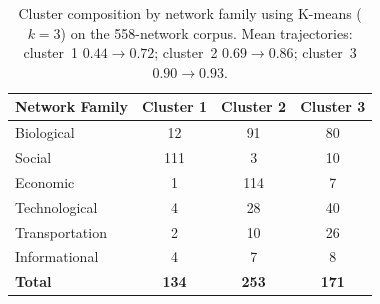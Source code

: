 \begin{table}[t]
    \centering
    \caption{Cluster composition by network family using K-means ($k=3$) on the 558-network corpus. Mean trajectories: cluster~1 $0.44 \to 0.72$; cluster~2 $0.69 \to 0.86$; cluster~3 $0.90 \to 0.93$.}
    \label{tab:kmeans3}
    \begin{tabular}{lccc}
        \toprule
        \textbf{Network Family} & \textbf{Cluster 1} & \textbf{Cluster 2} & \textbf{Cluster 3} \\
        \midrule
        Biological     &  12 &  91 &  80 \\
        Social         & 111 &   3 &  10 \\
        Economic       &   1 & 114 &   7 \\
        Technological  &   4 &  28 &  40 \\
        Transportation &   2 &  10 &  26 \\
        Informational  &   4 &   7 &   8 \\
        \midrule
        \textbf{Total} & \textbf{134} & \textbf{253} & \textbf{171} \\
        \bottomrule
    \end{tabular}
\end{table}

